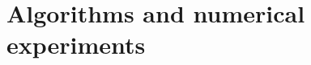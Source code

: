 \documentclass[12pt]{article}
\newcommand{\1}{\mathbf{1}}
\newcommand{\aseq}{\stackrel{a.s.}{=}}
\theoremstyle{plain}
\theoremstyle{definition}
\theoremstyle{remark}
\theoremstyle{plain}
\theoremstyle{remark}
\theoremstyle{plain}
\newtheorem{corollary}[thm]{\protect\corollaryname}
\theoremstyle{plain}
\newtheorem{proposition}[thm]{\protect\propositionname}
\providecommand{\corollaryname}{Corollary}
\providecommand{\propositionname}{Proposition}
\begin{document}
%
%
%
%
%
%
%

\section{Algorithms and numerical experiments}
\end{document}
